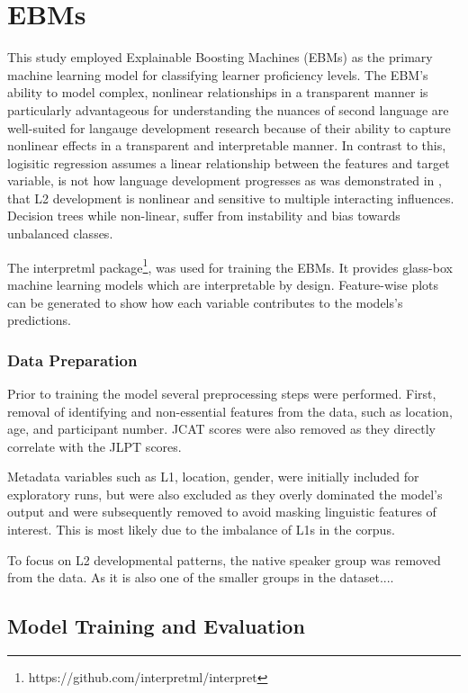 \section{EBMs}
This study employed Explainable Boosting Machines (EBMs) \citep{nori2019} as the primary machine learning model for
classifying learner proficiency levels. The EBM's ability to model complex, nonlinear relationships in a transparent
manner is
particularly advantageous for understanding the nuances of second language
are well-suited for langauge development
research because of their ability to
capture
nonlinear
effects in a
transparent and interpretable manner. In contrast to this, logisitic regression assumes a linear relationship
between the features and target variable, is not how language development progresses as was
demonstrated in \citet{Debot2007}, that L2 development is nonlinear and sensitive to multiple interacting influences.
Decision trees while non-linear, suffer from
instability and bias towards
unbalanced classes.

The interpretml package\footnote{https://github.com/interpretml/interpret}, was used for training the EBMs. It
provides glass-box machine learning models which are interpretable by design. Feature-wise plots can be generated to
show how each variable contributes to the models's predictions.

\subsubsection{Data Preparation}
Prior to training the model several preprocessing steps were performed. First, removal of identifying and non-essential
features from the data, such as location, age, and participant number. JCAT scores were also removed as they
directly correlate with the JLPT scores.

Metadata variables such as L1, location, gender, were initially included for
exploratory
runs, but were also excluded as they overly dominated the model's output and were subsequently removed to avoid
masking linguistic features of interest. This is most likely due to the imbalance of L1s in the corpus.

To focus on L2 developmental patterns, the native speaker group was removed from the data. As it is also one of the
smaller groups in the dataset....

\subsection{Model Training and Evaluation}

